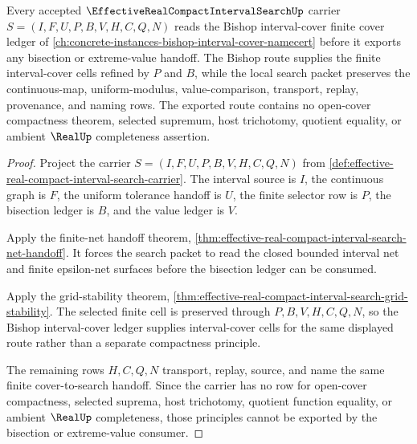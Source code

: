 \begin{theorem}
\label{thm:effective-real-compact-interval-search-bishop-cover-link}
Every accepted $\EffectiveRealCompactIntervalSearchUp$ carrier $S=(I,F,U,P,B,V,H,C,Q,N)$ reads the Bishop interval-cover finite cover ledger of \autoref{ch:concrete-instances-bishop-interval-cover-namecert} before it exports any bisection or extreme-value handoff. The Bishop route supplies the finite interval-cover cells refined by $P$ and $B$, while the local search packet preserves the continuous-map, uniform-modulus, value-comparison, transport, replay, provenance, and naming rows. The exported route contains no open-cover compactness theorem, selected supremum, host trichotomy, quotient equality, or ambient $\RealUp$ completeness assertion.
\end{theorem}
\begin{proof}
Project the carrier $S=(I,F,U,P,B,V,H,C,Q,N)$ from \autoref{def:effective-real-compact-interval-search-carrier}. The interval source is $I$, the continuous graph is $F$, the uniform tolerance handoff is $U$, the finite selector row is $P$, the bisection ledger is $B$, and the value ledger is $V$.

Apply the finite-net handoff theorem, \autoref{thm:effective-real-compact-interval-search-net-handoff}. It forces the search packet to read the closed bounded interval net and finite epsilon-net surfaces before the bisection ledger can be consumed.

Apply the grid-stability theorem, \autoref{thm:effective-real-compact-interval-search-grid-stability}. The selected finite cell is preserved through $P,B,V,H,C,Q,N$, so the Bishop interval-cover ledger supplies interval-cover cells for the same displayed route rather than a separate compactness principle.

The remaining rows $H,C,Q,N$ transport, replay, source, and name the same finite cover-to-search handoff. Since the carrier has no row for open-cover compactness, selected suprema, host trichotomy, quotient function equality, or ambient $\RealUp$ completeness, those principles cannot be exported by the bisection or extreme-value consumer.
\end{proof}


